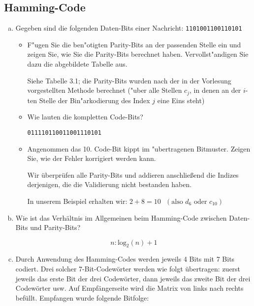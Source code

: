 \setcounter{section}{3}
\setcounter{subsection}{2} %
\subsection{Hamming-Code}

\newcommand{\cs}[1]{\texttt{\symbol{}#1}}

\begin{enumerate}[(a)]
    \item Gegeben sind die folgenden Daten-Bits einer Nachricht: \verb|1101001100110101|
        \begin{itemize}
            \item F"ugen Sie die ben"otigten Parity-Bits an der passenden
                Stelle ein und zeigen Sie, wie Sie die Parity-Bits berechnet
                haben. Vervollst"andigen Sie dazu die abgebildete Tabelle aus.

                Siehe Tabelle 3.1; die Parity-Bits wurden nach der in der
                Vorlesung vorgestellten Methode berechnet ("uber alle Stellen
                $c_j$, in denen an der $i$-ten Stelle der Bin"arkodierung des
                Index $j$ eine Eins steht)
            \item Wie lauten die kompletten Code-Bits?

                \verb+011110110011001110101+

            \item Angenommen das 10. Code-Bit kippt im "ubertragenen Bitmuster.
                Zeigen Sie, wie der Fehler korrigiert werden kann.

                Wir überprüfen alle Parity-Bits und addieren anschließend die
                Indizes derjenigen, die die Validierung nicht bestanden haben.

                In unserem Beispiel erhalten wir: $2 + 8 = 10\ \ \ (\text{also } d_6 \text{ oder } c_{10})$
        \end{itemize}

        \item Wie ist das Verhältnis im Allgemeinen beim Hamming-Code zwischen
            Daten-Bits und Parity-Bits?
            
            \begin{equation*}
                n : \text{log}_2(n) + 1
            \end{equation*}

        \item Durch Anwendung des Hamming-Codes werden jeweils 4 Bits mit 7 Bits
            codiert. Drei solcher 7-Bit-Codewörter werden wie folgt übertragen: zuerst
            jeweils das erste Bit der drei Codewörter, dann jeweils das zweite Bit der drei
            Codewörter usw. Auf Empfängerseite wird die Matrix von links nach rechts
            befüllt. Empfangen wurde folgende Bitfolge:


\end{enumerate}
